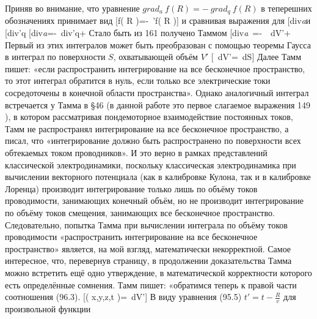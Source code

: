 \documentclass[11pt]{article}
\begin{document}
Приняв во внимание, что уравнение
\(gra{{d}_{a}}\ f\left( R \right)=-\ gra{{d}_{q}}\ f\left( R \right)\) в
теперешних обозначениях принимает вид {[}\nabla f\left( R
\right)=-~\nabla 'f\left( R \right){]} и сравнивая выражения для
{[}di{{v}\emph{{a}}\frac{\overrightarrow{j}}{R}{]}и
{[}div{{'}}{q}}\frac{\overrightarrow{j}}{R}{]}
{[}di{{v}\emph{{a}}=-~div{{'}}{q}}+\frac{1}{R}{{\left( div{{'}_{q}}\ \overrightarrow{j} \right)}_{t'=const}}{]}
Стало быть из 161 получено Таммом
{[}di{{v}\emph{{a}}~=-~~dV'+\int{\frac{dV'}{R}}{{\left( div{{'}_{q}}\ \overrightarrow{j} \right)}_{t'=const}}{]}
Первый из этих интегралов может быть преобразован с помощью теоремы
Гаусса в интеграл по поверхности \(S\), охватывающей объём \(V'\)
{[}~dV'=~dS{]}
Далее Тамм пишет: «если распространить интегрирование на все бесконечное
пространство, то этот интеграл обратится в нуль, если только все
электрические токи сосредоточены в конечной области пространства».
Однако аналогичный интеграл встречается у Тамма в §46 (в данной работе
это первое слагаемое выражения 149 ), в котором рассматривая
пондемоторное взаимодействие постоянных токов, Тамм не распространял
интегрирование на все бесконечное пространство, а писал, что
«интегрирование должно быть распространено по поверхности всех
обтекаемых током проводников». И это верно в рамках представлений
классической электродинамики, поскольку классическая электродинамика при
вычислении векторного потенциала (как в калибровке Кулона, так и в
калибровке Лоренца) производит интегрирование только лишь по объёму
токов проводимости, занимающих конечный объём, но не производит
интегрирование по объёму токов смещения, занимающих все бесконечное
пространство. Следовательно, попытка Тамма при вычислении интеграла по
объёму токов проводимости «распространить интегрирование на все
бесконечное пространство» является, на мой взгляд, математически
некорректной. Самое интересное, что, перевернув страницу, в продолжении
доказательства Тамма можно встретить ещё одно утверждение, в
математической корректности которого есть определённые сомнения. Тамм
пишет: «обратимся теперь к правой части соотношения (96.3).
{[}\varphi \left( x,y,z,t
\right)=~dV'{]}
В виду уравнения (95.5) \(t'=t-\frac{R}{v}\) для произвольной функции
}
\end{document}
